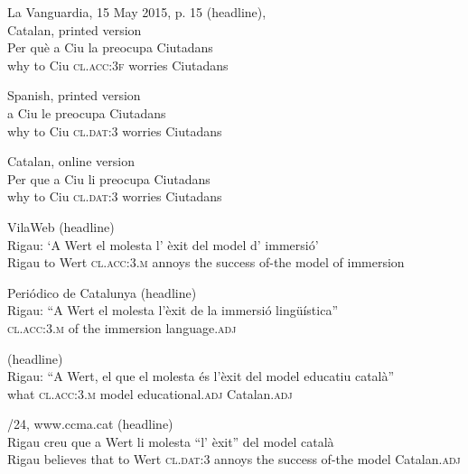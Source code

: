 \documentclass[output=paper,colorlinks,citecolor=brown,nonflat]{./langscibook}
\begin{document}
\ea%
 {La} {Vanguardia}, 15 May 2015, p. 15 (headline), 
 \label{ex:royo:5}\\
 \ea Catalan, printed version \label{ex:royo:5a}\\
 \gll Per què a Ciu la preocupa Ciutadans \\
 why to Ciu \textsc{cl.acc:3f} worries Ciutadans
 \\
 \glt
 
 \ex Spanish, printed version \label{ex:royo:5b}\\
  a Ciu le preocupa Ciutadans\\
 why to Ciu \textsc{cl.dat:3} worries Ciutadans\\
 \glt
 
\ex Catalan, online version \label{ex:royo:5c}\\
 \gll Per que a Ciu li preocupa Ciutadans \\
 why to Ciu \textsc{cl.dat:3} worries Ciutadans\\
 \glt
 
 \z
 \z


\ea%
 \label{ex:royo:6}
 \ea VilaWeb (headline)\\
 \gll Rigau: ‘A Wert el molesta l’ èxit del model d’ immersió’\\
 Rigau to Wert \textsc{cl.acc:3.m} annoys the success of-the model of immersion \\
 \glt
 
  {Periódico} {de} {Catalunya} (headline)\\
 \gll Rigau: “A Wert el molesta l’èxit de la immersió lingüística”\\
 \textsc{cl.acc:3.m} of the immersion language.\textsc{adj}\\
 \glt
 
  (headline)\\
 \gll Rigau: “A Wert, el que el molesta és l’èxit del model educatiu català”\\
 what \textsc{cl.acc:3.m} model educational.\textsc{adj} Catalan.\textsc{adj}\\
 \glt 
 
 \z
 \z



\ea%
 \label{ex:royo:7}
 /24, www.ccma.cat (headline)\\
 \gll Rigau creu que a Wert li molesta “l' èxit” del model català\\
 Rigau believes that to Wert \textsc{cl.dat:3} annoys the success of-the model Catalan.\textsc{adj}\\
 \glt
 
\end{document}
